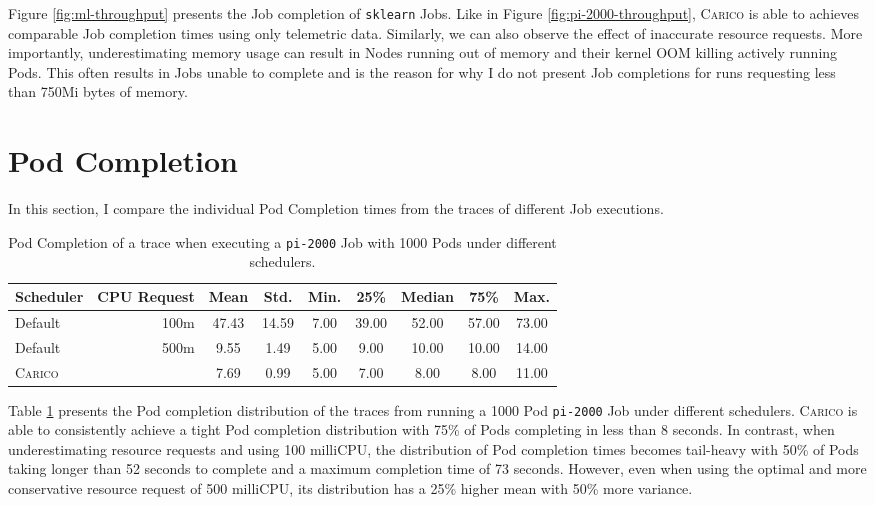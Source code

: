 Figure \ref{fig:ml-throughput} presents the Job completion of \texttt{sklearn}
Jobs. Like in Figure \ref{fig:pi-2000-throughput}, \textsc{Carico} is able to
achieves comparable Job completion times using only telemetric data. Similarly,
we can also observe the effect of inaccurate resource requests. More importantly,
underestimating memory usage can result in Nodes running out of memory and
their kernel OOM killing actively running Pods. This often results in Jobs
unable to complete and is the reason for why I do not present Job completions
for runs requesting less than 750Mi bytes of memory.

\section{Pod Completion}
\label{sec:eval-pod-completion}
In this section, I compare the individual Pod Completion times from the traces
of different Job executions.

\begin{table}[h!]
\centering
    \begin{tabular}{|l|r|c|c|c|c|c|c|c|}
    \hline
        \bfseries Scheduler & \bfseries CPU Request & \bfseries Mean & \bfseries Std. &
        \bfseries Min. & \bfseries 25\% & \bfseries Median & \bfseries 75\% & \bfseries Max. \\
    \hline
        Default & 100m & 47.43 & 14.59 & 7.00 & 39.00 & 52.00 & 57.00 & 73.00
        \\
        Default & 500m & 9.55 & 1.49 & 5.00 & 9.00 & 10.00 & 10.00 & 14.00
        \\
        \textsc{Carico} & & 7.69 & 0.99 & 5.00 & 7.00 & 8.00 & 8.00 & 11.00 \\
    \hline
    \end{tabular}
    \caption{Pod Completion of a trace when executing a \texttt{pi-2000} Job
    with 1000 Pods under different schedulers.}
    \label{tab:cpu-pod-completions}
\end{table}

Table \ref{tab:cpu-pod-completions} presents the Pod completion distribution of
the traces from running a 1000 Pod \texttt{pi-2000} Job under different
schedulers. \textsc{Carico} is able to consistently achieve a tight Pod
completion distribution with 75\% of Pods completing in less than 8 seconds. In
contrast, when underestimating resource requests and using 100 milliCPU, the
distribution of Pod completion times becomes tail-heavy with 50\% of Pods taking
longer than 52 seconds to complete and a maximum completion time of 73 seconds.
However, even when using the optimal and more conservative resource request of
500 milliCPU, its distribution has a 25\% higher mean with 50\% more variance.

